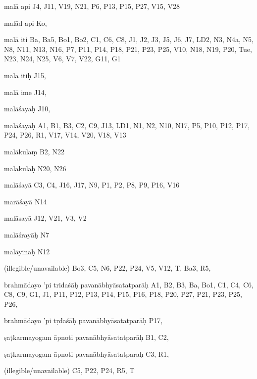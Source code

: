 \begin{marma}[hp02_009]
\begin{marma}[hp02_011]
\begin{marma}[hp02_38a]
\begin{description}
    \end{description}
 \end{marma}

 \begin{marma}[hp02_38b]
\item[malā api] J4, J11, V19, N21, P6, P13, P15, P27, V15, V28
\item[malād api] Ko,
\item[malā iti] Ba, Ba5, Bo1, Bo2, C1, C6, C8, J1, J2, J3, J5, J6, J7, LD2, N3, N4a, N5, N8, N11, N13, N16, P7, P11, P14, P18, P21, P23, P25, V10, N18, N19, P20, Tue, N23, N24, N25, V6, V7, V22, G11, G1
\item[malā itiḥ] J15,
\item[malā ime] J14, 
\item[malāśayaḥ] J10,
\item[malāśayāḥ] A1, B1, B3, C2, C9, J13, LD1, N1, N2, N10, N17, P5, P10, P12, P17, P24, P26, R1, V17, V14, V20, V18, V13
\item[malākulaṃ] B2, N22
\item[malākulāḥ] N20, N26
\item[malāśayā] C3, C4, J16, J17, N9, P1, P2, P8, P9, P16, V16
\item[marāśayā] N14
\item[malāsayā] J12, V21, V3, V2
\item[malāśrayāḥ] N7
\item[malāyinaḥ] N12
\item[(illegible/unavailable)] Bo3, C5, N6, P22, P24, V5, V12, T, Ba3, R5,
  \begin{description}

    \end{description}
 \end{marma}

 \begin{marma}[hp02_39ab]
\item[brahmādayo 'pi tridaśāḥ pavanābhyāsatatparāḥ] A1, B2, B3, Ba, Bo1, C1, C4, C6, C8, C9, G1, J1, P11, P12, P13, P14, P15, P16, P18, P20, P27, P21, P23, P25, P26,
\item[brahmādayo 'pi tṛdaśāḥ pavanābhyāsatatparāḥ] P17,
\item[ṣaṭkarmayogam āpnoti pavanābhyāsatatparāḥ] B1, C2, 
\item[ṣaṭkarmayogam āpnoti pavanābhyāsatatparaḥ] C3, R1,
\item[(illegible/unavailable)] C5, P22, P24, R5, T
  \begin{description}


\end{description}
\end{marma}
\end{marma}
\end{marma}

